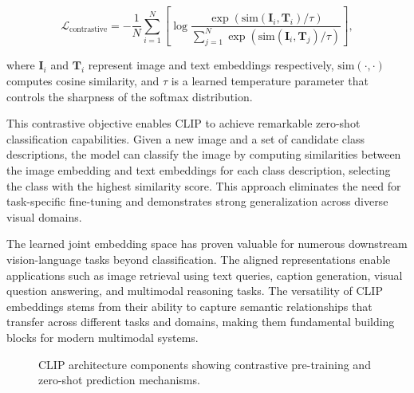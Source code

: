 \begin{equation}
\mathcal{L}_{\text{contrastive}} = -\frac{1}{N}\sum_{i=1}^{N} \left[ \log \frac{\exp(\text{sim}(\mathbf{I}_i, \mathbf{T}_i) / \tau)}{\sum_{j=1}^{N} \exp(\text{sim}(\mathbf{I}_i, \mathbf{T}_j) / \tau)} \right],
\end{equation}

where $\mathbf{I}_i$ and $\mathbf{T}_i$ represent image and text embeddings respectively, $\text{sim}(\cdot, \cdot)$ computes cosine similarity, and $\tau$ is a learned temperature parameter that controls the sharpness of the softmax distribution.

This contrastive objective enables CLIP to achieve remarkable zero-shot classification capabilities. Given a new image and a set of candidate class descriptions, the model can classify the image by computing similarities between the image embedding and text embeddings for each class description, selecting the class with the highest similarity score. This approach eliminates the need for task-specific fine-tuning and demonstrates strong generalization across diverse visual domains.

The learned joint embedding space has proven valuable for numerous downstream vision-language tasks beyond classification. The aligned representations enable applications such as image retrieval using text queries, caption generation, visual question answering, and multimodal reasoning tasks. The versatility of CLIP embeddings stems from their ability to capture semantic relationships that transfer across different tasks and domains, making them fundamental building blocks for modern multimodal systems.

\begin{figure}[htbp]
\centering
{}
\hfill
{}
\caption{CLIP architecture components showing contrastive pre-training and zero-shot prediction mechanisms.}
\label{fig:clip_architecture}
\end{figure}

